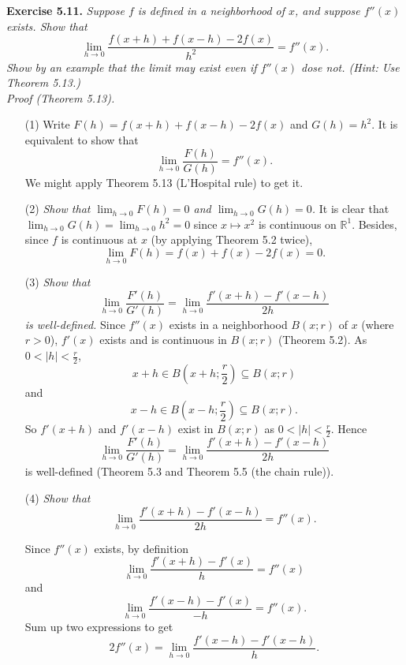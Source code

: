 \documentclass{article}
\begin{document}



\textbf{Exercise 5.11.}
\emph{Suppose $f$ is defined in a neighborhood of $x$, and suppose $f''(x)$ exists.
Show that
\[
  \lim_{h \to 0}{\frac{f(x+h) + f(x-h) - 2f(x)}{h^2}} = f''(x).
\]
Show by an example that the limit may exist even if $f''(x)$ dose not.
(Hint: Use Theorem 5.13.)} \\

\emph{Proof (Theorem 5.13).}
\begin{enumerate}
  \item[(1)]
  Write $F(h) = f(x+h) + f(x-h) - 2f(x)$ and $G(h) = h^2$.
  It is equivalent to show that
  \[
    \lim_{h \to 0}\frac{F(h)}{G(h)} = f''(x).
  \]
  We might apply Theorem 5.13 (L'Hospital rule) to get it.

  \item[(2)]
  \emph{Show that $\lim_{h \to 0} F(h) = 0$ and $\lim_{h \to 0} G(h) = 0$.}
  It is clear that $\lim_{h \to 0} G(h) = \lim_{h \to 0} h^2 = 0$
  since $x \mapsto x^2$ is continuous on $\mathbb{R}^1$.
  Besides, since $f$ is continuous at $x$ (by applying Theorem 5.2 twice),
  \[
    \lim_{h \to 0} F(h)
    = f(x) + f(x) - 2f(x)
    = 0.
  \]

  \item[(3)]
  \emph{Show that
  \[
    \lim_{h \to 0} \frac{F'(h)}{G'(h)} = \lim_{h \to 0} \frac{f'(x+h) - f'(x-h)}{2h}
  \]
  is well-defined.}
  Since $f''(x)$ exists in a neighborhood $B(x;r)$ of $x$ (where $r > 0$),
  $f'(x)$ exists and is continuous in $B(x;r)$ (Theorem 5.2).
  As $0 < |h| < \frac{r}{2}$,
  \[
    x+h \in B\left(x+h;\frac{r}{2}\right) \subseteq B(x;r)
  \]
  and
  \[
    x-h \in B\left(x-h;\frac{r}{2}\right) \subseteq B(x;r).
  \]
  So $f'(x+h)$ and $f'(x-h)$ exist in $B(x;r)$ as $0 < |h| < \frac{r}{2}$.
  Hence
  \[
    \lim_{h \to 0} \frac{F'(h)}{G'(h)}
    = \lim_{h \to 0} \frac{f'(x+h) - f'(x-h)}{2h}
  \]
  is well-defined (Theorem 5.3 and Theorem 5.5 (the chain rule)).

  \item[(4)]
  \emph{Show that
  \[
    \lim_{h \to 0} \frac{f'(x+h) - f'(x-h)}{2h} = f''(x).
  \]}

  Since $f''(x)$ exists, by definition
  \[
    \lim_{h \to 0} \frac{f'(x+h) - f'(x)}{h} = f''(x)
  \]
  and
  \[
    \lim_{h \to 0} \frac{f'(x-h) - f'(x)}{-h} = f''(x).
  \]
  Sum up two expressions to get
  \[
    2 f''(x) = \lim_{h \to 0} \frac{f'(x-h) - f'(x-h)}{h}.
  \]


\end{enumerate}
\end{document}
